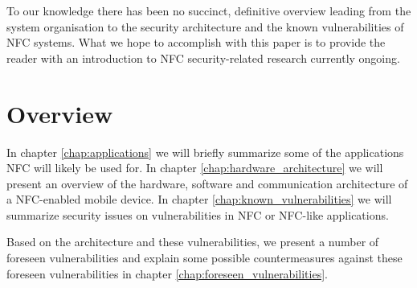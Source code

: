 To our knowledge there has been no succinct, definitive overview leading from the system organisation to the security architecture and the known vulnerabilities of NFC systems.
What we hope to accomplish with this paper is to provide the reader with an introduction to NFC security-related research currently ongoing.

\newpage

\section{Overview}
In chapter \ref{chap:applications} we will briefly summarize some of the applications NFC will likely be used for.
In chapter \ref{chap:hardware_architecture} we will present an overview of the hardware, software and communication architecture of a NFC-enabled mobile device.
In chapter \ref{chap:known_vulnerabilities} we will summarize security issues on vulnerabilities in NFC or NFC-like applications.

Based on the architecture and these vulnerabilities, we present a number of foreseen vulnerabilities and explain some possible countermeasures against these foreseen vulnerabilities in chapter \ref{chap:foreseen_vulnerabilities}.


